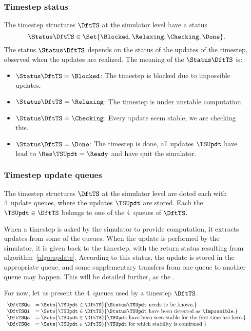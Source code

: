 \subsubsection{Timestep status}

The timestep structures $\DftTS$ at the simulator level have a status $$\Status\DftTS \in \Set{\Blocked, \Relaxing, \Checking, \Done}.$$ The status $\Status\DftTS$ depends on the status of the updates of the timestep, observed when the updates are realized. The meaning of the $\Status\DftTS$ is:
\begin{itemize}
\item $\Status\DftTS = \Blocked$: The timestep is blocked due to impossible updates.
\item $\Status\DftTS = \Relaxing$: The timestep is under unstable computation.
\item $\Status\DftTS = \Checking$: Every update seem stable, we are checking this.
\item $\Status\DftTS = \Done$: The timestep is done, all updates $\TSUpdt$ have lead to $\Res\TSUpdt = \Ready$ and have quit the simulator.
\end{itemize}

\subsubsection{Timestep update queues}

The timestep structures $\DftTS$ at the simulator level are doted each with 4~update queues, where the updates $\TSUpdt$ are stored. Each the $\TSUpdt \in \DftTS$ belongs to one of the 4~queues of $\DftTS$.

When a timestep is asked by the simulator to provide computation, it extracts updates from some of the queues. When the update is performed by the simulator, it is given back to the timestep, with the return status resulting from algorithm~\ref{algo:update}. According to this status, the update is stored in the appropriate queue, and some supplementary transfers from one queue to another queue may happen. This will be detailed further, as the .

For now, let us present the 4~queues used by a timestep $\DftTS$.
\begin{equation}
  \begin{array}{ll}
    \DftTSQu &= \Sets{\TSUpdt\in\DftTS}{\Status\TSUpdt \mbox{ needs to be known.}}                           \\
    \DftTSQi &= \Sets{\TSUpdt\in\DftTS}{\Status\TSUpdt \mbox{ have been detected as } \Impossible.}         \\
    \DftTSQs &= \Sets{\TSUpdt\in\DftTS}{\TSUpdt \mbox{ have been seen stable for the first time are here.}} \\
    \DftTSQc &= \Sets{\TSUpdt\in\DftTS}{\TSUpdt \mbox{ for which stability is confirmed.}}
  \end{array}
\end{equation}

